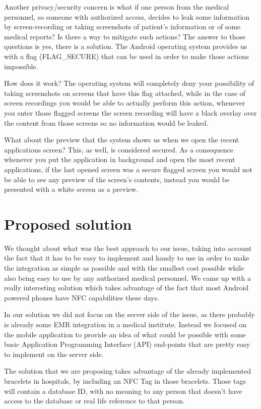 Another privacy/security concern is what if one person from the medical personnel, so someone with authorized access, decides to leak some information by screen-recording or taking screenshots of patient's information or of some medical reports? Is there a way to mitigate such actions? The answer to those questions is yes, there is a solution. The Android operating system provides us with a flag (FLAG\_SECURE) that can be used in order to make those actions impossible. 

How does it work? The operating system will completely deny your possibility of taking screenshots on screens that have this flag attached, while in the case of screen recordings you would be able to actually perform this action, whenever you enter those flagged screens the screen recording will have a black overlay over the content from those screens so no information would be leaked. 

What about the preview that the system shows us when we open the recent applications screen? This, as well, is considered secured. As a consequence whenever you put the application in background and open the most recent applications, if the last opened screen was a secure flagged screen you would not be able to see any preview of the screen's contents, instead you would be presented with a white screen as a preview.

\section{Proposed solution}
\label{sec:ch2sec6}

\par We thought about what was the best approach to our issue, taking into account the fact that it has to be easy to implement and handy to use in order to make the integration as simple as possible and with the smallest cost possible while also being easy to use by any authorized medical personnel. We came up with a really interesting solution which takes advantage of the fact that most Android powered phones have NFC capabilities these days.

In our solution we did not focus on the server side of the issue, as there probably is already some EMR integration in a medical institute. Instead we focused on the mobile application to provide an idea of what could be possible with some basic Application Programming Interface (API) end-points that are pretty easy to implement on the server side.

The solution that we are proposing takes advantage of the already implemented bracelets in hospitals, by including an NFC Tag in those bracelets. Those tags will contain a database ID, with no meaning to any person that doesn't have access to the database or real life reference to that person.

